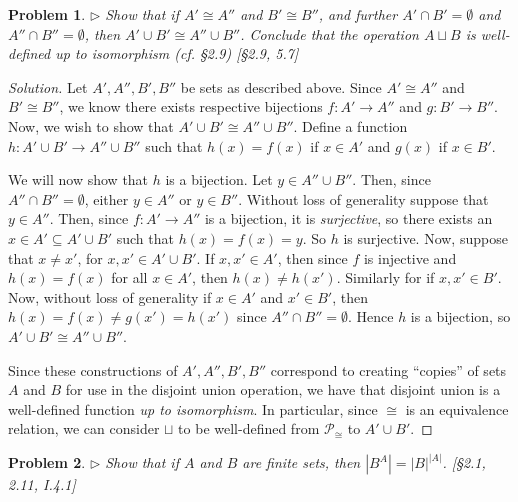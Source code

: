 \documentclass[fontsize=14pt]{scrartcl}
\newtheorem{problem-internal}{Problem}[subsection]
\newenvironment{problem}{
  \medskip
  \begin{problem-internal}
}{
  \end{problem-internal}
}
\newenvironment{solution}{
  \begin{proof}[Solution]
  \vspace{-8px}
  \setlength{\parskip}{4px}
  \setlength{\parindent}{0px}
}{
  \end{proof}
}
\newcommand{\abs}[1]{\left|#1\right|}
\begin{document}
\begin{problem}
$\rhd$ Show that if $A'\cong A''$ and $B'\cong B''$, and further
$A'\cap B'=\emptyset$ and $A''\cap B''=\emptyset$, then $A'\cup B'\cong A''\cup
B''$. Conclude that the operation $A\sqcup B$ is well-defined up to
\textit{isomorphism} (cf. \S2.9) [\S2.9, 5.7]
\end{problem}

\begin{solution}
Let $A',A'',B',B''$ be sets as described above. Since $A'\cong A''$ and $B'\cong
B''$, we know there exists respective bijections $f:A'\to A''$ and $g:B'\to
B''$. Now, we wish to show that $A'\cup B'\cong A''\cup B''$. Define a function
$h:A'\cup B'\to A''\cup B''$ such that $h(x) = f(x)$ if $x\in A'$ and $g(x)$ if
$x\in B'$.

We will now show that $h$ is a bijection. Let $y\in A''\cup B''$. Then, since
$A''\cap B''=\emptyset$, either $y\in A''$ or $y\in B''$. Without loss of
generality suppose that $y\in A''$. Then, since $f:A'\to A''$ is a bijection, it
is \textit{surjective}, so there exists an $x\in A'\subseteq A'\cup B'$ such
that $h(x) = f(x) = y$. So $h$ is surjective. Now, suppose that $x\neq x'$, for
$x,x'\in A'\cup B'$. If $x,x'\in A'$, then since $f$ is injective and $h(x) =
f(x)$ for all $x\in A'$, then $h(x)\neq h(x')$. Similarly for if $x,x'\in B'$.
Now, without loss of generality if $x\in A'$ and $x'\in B'$, then $h(x) = f(x)
\neq g(x') = h(x')$ since $A''\cap B''=\emptyset$. Hence $h$ is a bijection, so
$A'\cup B'\cong A''\cup B''$.

Since these constructions of $A',A'',B',B''$ correspond to creating ``copies''
of sets $A$ and $B$ for use in the disjoint union operation, we have that
disjoint union is a well-defined function \textit{up to isomorphism}. In
particular, since $\cong$ is an equivalence relation, we can consider $\sqcup$
to be well-defined from $\mathscr{P}_{\cong}$ to $A'\cup B'$.
\end{solution}


\begin{problem}
$\rhd$ Show that if $A$ and $B$ are finite sets, then $\abs{B^A} =
\abs{B}^{\abs{A}}$. [\S2.1, 2.11, I.4.1]
\end{problem}
\end{document}
